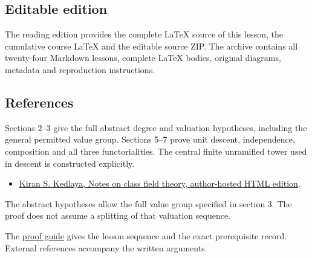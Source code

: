 \documentclass[11pt,a4paper]{article}
\newcommand{\tightlist}{\setlength{\itemsep}{0pt}\setlength{\parskip}{0pt}}
\begin{document}
\subsection{Editable edition}\label{editable-edition}

The reading edition provides the complete LaTeX source of this lesson,
the cumulative course LaTeX and the editable source ZIP. The archive
contains all twenty-four Markdown lessons, complete LaTeX bodies,
original diagrams, metadata and reproduction instructions.

\subsection{References}\label{references}

Sections 2--3 give the full abstract degree and valuation hypotheses,
including the general permitted value group. Sections 5--7 prove unit
descent, independence, composition and all three functorialities. The
central finite unramified tower used in descent is constructed
explicitly.

\begin{itemize}
\tightlist
\item
  \href{https://kskedlaya.org/cft/sec_abstractcft1.html}{Kiran S.
  Kedlaya, Notes on class field theory, author-hosted HTML edition}.
\end{itemize}

The abstract hypotheses allow the full value group specified in section
3. The proof does not assume a splitting of that valuation sequence.

The \href{../free-proofs.html}{proof guide} gives the lesson sequence
and the exact prerequisite record. External references accompany the
written arguments.
\end{document}
